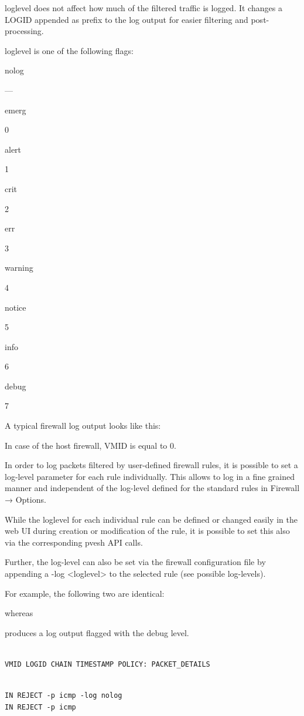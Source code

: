 loglevel does not affect how much of the filtered traffic is logged. It changes a LOGID appended as prefix to the log output for easier filtering and post-processing.

loglevel is one of the following flags:

nolog

—

emerg

0

alert

1

crit

2

err

3

warning

4

notice

5

info

6

debug

7

A typical firewall log output looks like this:

In case of the host firewall, VMID is equal to 0.

In order to log packets filtered by user-defined firewall rules, it is possible to set a log-level parameter for each rule individually. This allows to log in a fine grained manner and independent of the log-level defined for the standard rules in Firewall → Options.

While the loglevel for each individual rule can be defined or changed easily in the web UI during creation or modification of the rule, it is possible to set this also via the corresponding pvesh API calls.

Further, the log-level can also be set via the firewall configuration file by appending a -log <loglevel> to the selected rule (see possible log-levels).

For example, the following two are identical:

whereas

produces a log output flagged with the debug level.

\begin{lstlisting}

VMID LOGID CHAIN TIMESTAMP POLICY: PACKET_DETAILS

\end{lstlisting}

\begin{lstlisting}

IN REJECT -p icmp -log nolog
IN REJECT -p icmp

\end{lstlisting}


